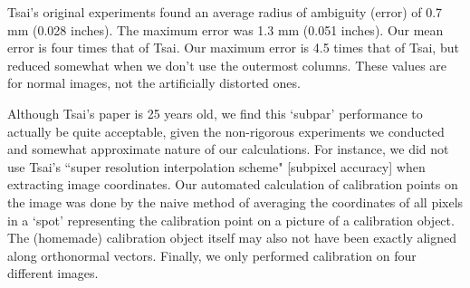 Tsai's original experiments found an average radius of ambiguity (error) of 0.7 mm (0.028 inches). The maximum error was 1.3 mm (0.051 inches). Our mean error is four times that of Tsai. \cite{TSAI} Our maximum error is 4.5 times that of Tsai, but reduced somewhat when we don't use the outermost columns. These values are for normal images, not the artificially distorted ones.

Although Tsai's paper is 25 years old, we find this `subpar' performance to actually be quite acceptable, given the non-rigorous experiments we conducted and somewhat approximate nature of our calculations. For instance, we did not use Tsai's ``super resolution interpolation scheme" [subpixel accuracy] when extracting image coordinates. Our automated calculation of calibration points on the image was done by the naive method of averaging the coordinates of all pixels in a `spot' representing the calibration point on a picture of a calibration object. The (homemade) calibration object itself may also not have been exactly aligned along orthonormal vectors. Finally, we only performed calibration on four different images.
